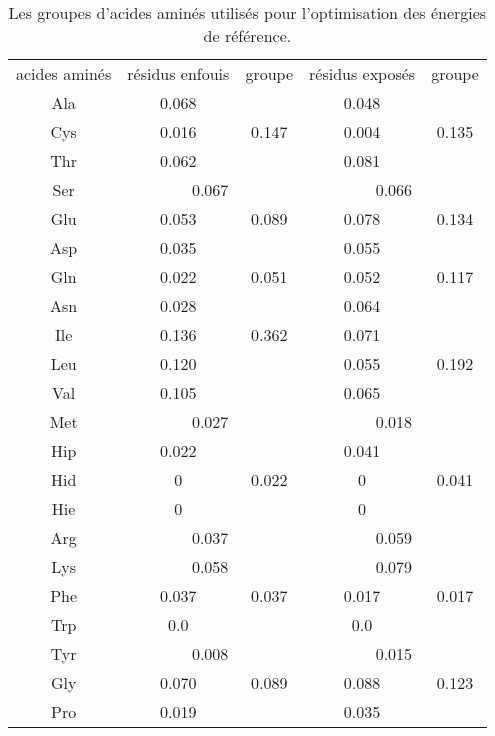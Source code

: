     \begin{table}[!htbp]
      \centering

      \begin{tabular}{c|cc|cc}

        \toprule
        acides aminés & résidus enfouis & groupe & résidus exposés & groupe\\
        \cmidrule{1-5}

        Ala &         0.068 &       &   0.048   \\
        Cys &         0.016 &  0.147  &   0.004 & 0.135  \\    
        Thr &         0.062 &        &   0.081   \\
        \cmidrule{1-5}
        Ser &        \multicolumn{2}{c|}{0.067}     &   \multicolumn{2}{c}{0.066}  \\
        \cmidrule{1-5}
        Glu &         0.053 & 0.089        &   0.078 & 0.134 \\
        Asp &         0.035 &    &   0.055   \\
        \cmidrule{1-5}
        Gln &         0.022 & 0.051 &   0.052 & 0.117\\
        Asn &         0.028 &         &   0.064   \\
        \cmidrule{1-5}
        Ile &         0.136 & 0.362        &   0.071  \\
        Leu &         0.120 &   &   0.055 & 0.192 \\
        Val &         0.105 &         &   0.065  \\
        \cmidrule{1-5}
        Met &    \multicolumn{2}{c|}{0.027}      &  \multicolumn{2}{c}{0.018} \\
        \cmidrule{1-5}
        Hip &         0.022 &      &   0.041 \\
        Hid &         0     &  0.022 &   0    & 0.041\\
        Hie &         0     &        &   0     \\
        \cmidrule{1-5}
        Arg &        \multicolumn{2}{c|}{0.037}      &  \multicolumn{2}{c}{0.059}\\
        \cmidrule{1-5}
        Lys &        \multicolumn{2}{c|}{0.058}         &  \multicolumn{2}{c}{0.079} \\
        \cmidrule{1-5}
        Phe &         0.037 &  0.037  &   0.017 & 0.017 \\
        Trp &         0.0   &        &   0.0  \\
        \cmidrule{1-5}
        Tyr &       \multicolumn{2}{c|}{0.008}      &  \multicolumn{2}{c}{0.015}\\
        \cmidrule{1-5}
        Gly &         0.070  & 0.089 &   0.088 & 0.123\\
        Pro &         0.019  &        &   0.035  \\
        \bottomrule


      \end{tabular}      
      \caption{Les groupes d'acides aminés utilisés pour l'optimisation des énergies de référence.}
\label{tab:AA_groupes}      
    \end{table}




